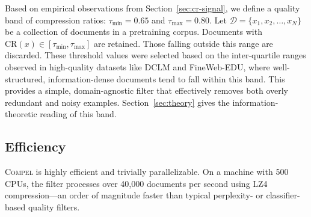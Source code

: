 Based on empirical observations from Section~\ref{sec:cr-signal}, we define a quality band of compression ratios: $\tau_{\min} = 0.65$ and $\tau_{\max} = 0.80$.
Let $\mathcal{D} = \{x_1, x_2, \dots, x_N\}$ be a collection of documents in a pretraining corpus.
Documents with $\mathrm{CR}(x) \in [\tau_{\min}, \tau_{\max}]$ are retained.
Those falling outside this range are discarded.
These threshold values were selected based on the inter-quartile ranges observed in high-quality datasets like DCLM and FineWeb-EDU, where well-structured, information-dense documents tend to fall within this band.
This provides a simple, domain-agnostic filter that effectively removes both overly redundant and noisy examples.
Section~\ref{sec:theory} gives the information-theoretic reading of this band.

\subsection{Efficiency}\label{sec:efficiency}

\textsc{Compel} is highly efficient and trivially parallelizable.
On a machine with 500 CPUs, the filter processes over 40{,}000 documents per second using LZ4 compression---an order of magnitude faster than typical perplexity- or classifier-based quality filters.
